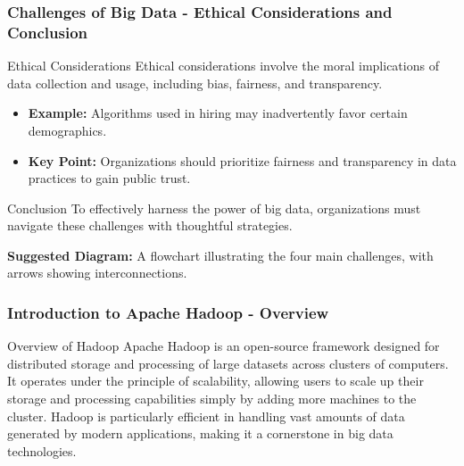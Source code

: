 \documentclass[aspectratio=169]{beamer}
\begin{document}
\begin{frame}[fragile]
    \frametitle{Challenges of Big Data - Ethical Considerations and Conclusion}
    \begin{block}{Ethical Considerations}
        Ethical considerations involve the moral implications of data collection and usage, including bias, fairness, and transparency.
    \end{block}
    \begin{itemize}
        \item \textbf{Example:} Algorithms used in hiring may inadvertently favor certain demographics.
        \item \textbf{Key Point:} Organizations should prioritize fairness and transparency in data practices to gain public trust.
    \end{itemize}

    \begin{block}{Conclusion}
        To effectively harness the power of big data, organizations must navigate these challenges with thoughtful strategies.
    \end{block}
    
    \textbf{Suggested Diagram:} A flowchart illustrating the four main challenges, with arrows showing interconnections.
\end{frame}

\begin{frame}[fragile]
    \frametitle{Introduction to Apache Hadoop - Overview}
    \begin{block}{Overview of Hadoop}
        Apache Hadoop is an open-source framework designed for distributed storage and processing of large datasets across clusters of computers. It operates under the principle of scalability, allowing users to scale up their storage and processing capabilities simply by adding more machines to the cluster. Hadoop is particularly efficient in handling vast amounts of data generated by modern applications, making it a cornerstone in big data technologies.
    \end{block}
\end{frame}
\end{document}
